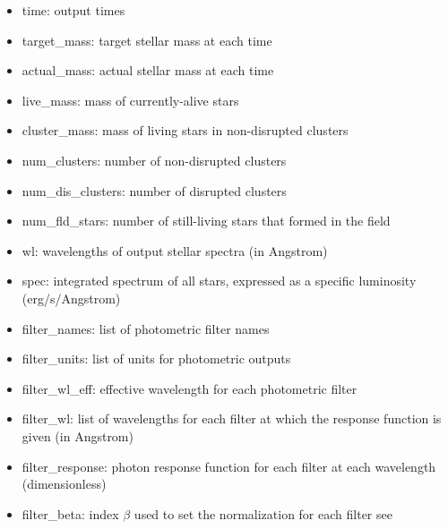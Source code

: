 \documentclass[letterpaper,10pt,english]{sphinxmanual}
\begin{document}
\begin{itemize}
\item {} 
time: output times

\item {} 
target\_mass: target stellar mass at each time

\item {} 
actual\_mass: actual stellar mass at each time

\item {} 
live\_mass: mass of currently-alive stars

\item {} 
cluster\_mass: mass of living stars in non-disrupted clusters

\item {} 
num\_clusters: number of non-disrupted clusters

\item {} 
num\_dis\_clusters: number of disrupted clusters

\item {} 
num\_fld\_stars: number of still-living stars that formed in the field

\item {} 
wl: wavelengths of output stellar spectra (in Angstrom)

\item {} 
spec: integrated spectrum of all stars, expressed as a specific luminosity (erg/s/Angstrom)

\item {} 
filter\_names: list of photometric filter names

\item {} 
filter\_units: list of units for photometric outputs

\item {} 
filter\_wl\_eff: effective wavelength for each photometric filter

\item {} 
filter\_wl: list of wavelengths for each filter at which the response function is given (in Angstrom)

\item {} 
filter\_response: photon response function for each filter at each wavelength (dimensionless)

\item {} 
filter\_beta: index \(\beta\) used to set the normalization for each filter \textendash{} see {\hyperref[\detokenize{intro:ssec-spec-phot}]{}}


\end{itemize}
\end{document}
